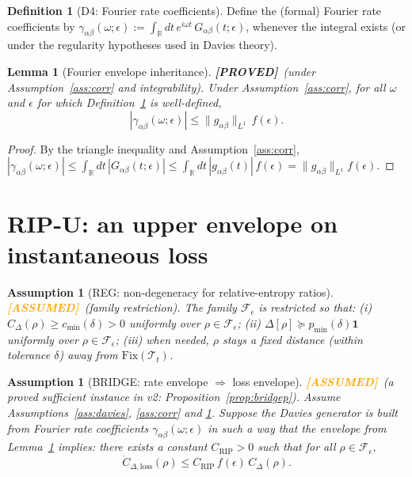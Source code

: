 \documentclass[11pt]{article}
\newtheorem{lemma}[theorem]{Lemma}
\newtheorem{assumption}[theorem]{Assumption}
\theoremstyle{definition}
\newtheorem{definition}[theorem]{Definition}
\theoremstyle{remark}
\newcommand{\ASSUMED}{\textcolor{orange}{\textbf{[ASSUMED]}}}
\newcommand{\PROVED}{\textcolor{green!60!black}{\textbf{[PROVED]}}}
\begin{document}
\begin{definition}[D4: Fourier rate coefficients]
\label{def:fourier}
Define the (formal) Fourier rate coefficients by
$\gamma_{\alpha\beta}(\omega;\epsilon) := \int_{\mathbb{R}} dt\,
e^{i\omega t}\, G_{\alpha\beta}(t;\epsilon)$, whenever the integral exists
(or under the regularity hypotheses used in Davies theory).
\end{definition}

\begin{lemma}[Fourier envelope inheritance]
\label{lem:envelope}
\PROVED\ (under Assumption~\ref{ass:corr} and integrability). Under
Assumption~\ref{ass:corr}, for all $\omega$ and $\epsilon$ for which
Definition~\ref{def:fourier} is well-defined,
\[
|\gamma_{\alpha\beta}(\omega;\epsilon)| \le
\|g_{\alpha\beta}\|_{L^1}\, f(\epsilon).
\]
\end{lemma}

\begin{proof}
By the triangle inequality and Assumption~\ref{ass:corr},
$|\gamma_{\alpha\beta}(\omega;\epsilon)| \le \int_{\mathbb{R}} dt\,
|G_{\alpha\beta}(t;\epsilon)| \le \int_{\mathbb{R}} dt\,
|g_{\alpha\beta}(t)|\, f(\epsilon) = \|g_{\alpha\beta}\|_{L^1}
f(\epsilon)$.
\end{proof}

\section{RIP-U: an upper envelope on instantaneous loss}

\begin{assumption}[REG: non-degeneracy for relative-entropy ratios]
\label{ass:reg}
\ASSUMED\ (family restriction). The family $\mathcal{F}_\epsilon$ is
restricted so that: (i) $C_\Delta(\rho) \ge c_{\min}(\delta) > 0$
uniformly over $\rho \in \mathcal{F}_\epsilon$; (ii) $\Delta[\rho]
\succeq p_{\min}(\delta)\mathbf{1}$ uniformly over $\rho \in
\mathcal{F}_\epsilon$; (iii) when needed, $\rho$ stays a fixed distance
(within tolerance $\delta$) away from $\mathrm{Fix}(\mathcal{T}_t)$.
\end{assumption}

\begin{assumption}[BRIDGE: rate envelope $\Rightarrow$ loss envelope]
\label{ass:bridge}
\ASSUMED\ (\emph{a proved sufficient instance in v2:}
Proposition~\ref{prop:bridgep}). Assume Assumptions~\ref{ass:davies},
\ref{ass:corr} and \ref{ass:reg}. Suppose the Davies generator is built
from Fourier rate coefficients $\gamma_{\alpha\beta}(\omega;\epsilon)$ in
such a way that the envelope from Lemma~\ref{lem:envelope} implies: there
exists a constant $C_{\mathrm{RIP}} > 0$ such that for all $\rho \in
\mathcal{F}_\epsilon$,
\[
\dot{C}_{\Delta,\mathrm{loss}}(\rho) \le C_{\mathrm{RIP}}\, f(\epsilon)\,
C_\Delta(\rho).
\]
\end{assumption}
\end{document}
